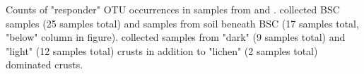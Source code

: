 Counts of "responder" OTU occurrences in samples from \citet{Steven_2013} and \citet{Garcia_Pichel_2013}. \citet{Steven_2013} collected BSC samples (25 samples total) and samples from soil beneath BSC (17 samples total, "below" column in figure). \citet{Garcia_Pichel_2013} collected samples from "dark" (9 samples total) and "light" (12 samples total) crusts in addition to "lichen" (2 samples total) dominated crusts.